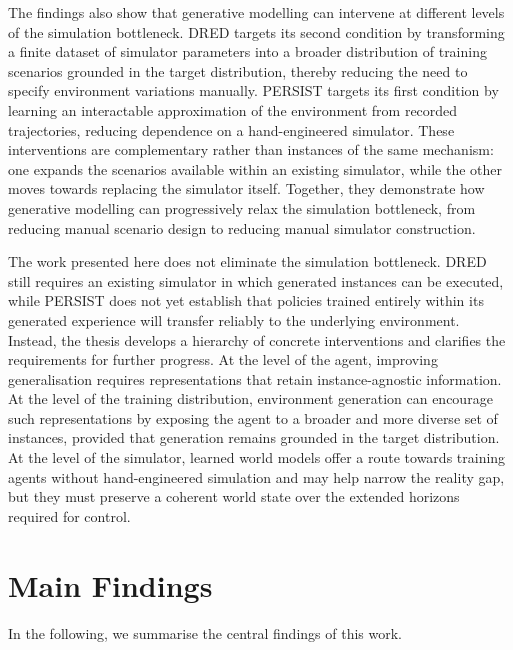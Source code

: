 The findings also show that generative modelling can intervene at different levels of the simulation bottleneck. DRED targets its second condition by transforming a finite dataset of simulator parameters into a broader distribution of training scenarios grounded in the target distribution, thereby reducing the need to specify environment variations manually. PERSIST targets its first condition by learning an interactable approximation of the environment from recorded trajectories, reducing dependence on a hand-engineered simulator. These interventions are complementary rather than instances of the same mechanism: one expands the scenarios available within an existing simulator, while the other moves towards replacing the simulator itself. Together, they demonstrate how generative modelling can progressively relax the simulation bottleneck, from reducing manual scenario design to reducing manual simulator construction.

The work presented here does not eliminate the simulation bottleneck. DRED still requires an existing simulator in which generated instances can be executed, while PERSIST does not yet establish that policies trained entirely within its generated experience will transfer reliably to the underlying environment. Instead, the thesis develops a hierarchy of concrete interventions and clarifies the requirements for further progress. At the level of the agent, improving generalisation requires representations that retain instance-agnostic information. At the level of the training distribution, environment generation can encourage such representations by exposing the agent to a broader and more diverse set of instances, provided that generation remains grounded in the target distribution. At the level of the simulator, learned world models offer a route towards training agents without hand-engineered simulation and may help narrow the reality gap, but they must preserve a coherent world state over the extended horizons required for control.


\section{Main Findings}
\label{sec:conclusion_main_findings}

In the following, we summarise the central findings of this work.

